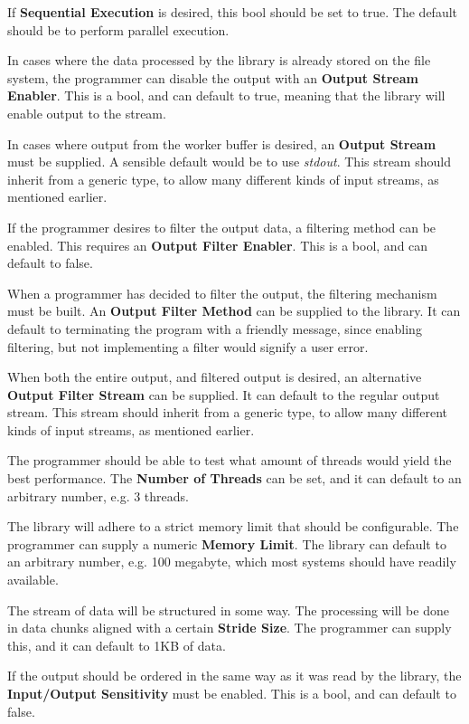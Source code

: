 \documentclass[a4paper]{article}
\begin{document}
If \textbf{Sequential Execution} is desired, this bool should be set to true. The default should be to perform parallel execution.

In cases where the data processed by the library is already stored on the file system, the programmer can disable the output with an \textbf{Output Stream Enabler}. This is a bool, and can default to true, meaning that the library will enable output to the stream.

In cases where output from the worker buffer is desired, an \textbf{Output Stream} must be supplied. A sensible default would be to use \textit{stdout}.  This stream should inherit from a generic type, to allow many different kinds of input streams, as mentioned earlier.

If the programmer desires to filter the output data, a filtering method can be enabled. This requires an \textbf{Output Filter Enabler}. This is a bool, and can default to false.

When a programmer has decided to filter the output, the filtering mechanism must be built. An \textbf{Output Filter Method} can be supplied to the library. It can default to terminating the program with a friendly message, since enabling filtering, but not implementing a filter would signify a user error.

When both the entire output, and filtered output is desired, an alternative \textbf{Output Filter Stream} can be supplied. It can default to the regular output stream. This stream should inherit from a generic type, to allow many different kinds of input streams, as mentioned earlier.

The programmer should be able to test what amount of threads would yield the best performance. The \textbf{Number of Threads} can be set, and it can default to an arbitrary number, e.g. 3 threads.

The library will adhere to a strict memory limit that should be configurable. The programmer can supply a numeric \textbf{Memory Limit}. The library can default to an arbitrary number, e.g. 100 megabyte, which most systems should have readily available.

The stream of data will be structured in some way. The processing will be done in data chunks aligned with a certain \textbf{Stride Size}. The programmer can supply this, and it can default to 1KB of data.

If the output should be ordered in the same way as it was read by the library, the \textbf{Input/Output Sensitivity} must be enabled. This is a bool, and can default to false.\\
\end{document}
